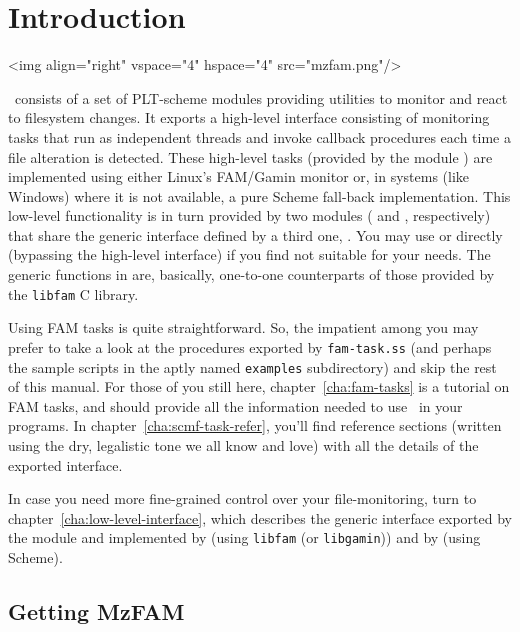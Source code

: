 
\chapter{Introduction}
\label{cha:introduction}

\htmlonly
\rawhtml<img align="right" vspace="4" hspace="4" src="mzfam.png"/>\endrawhtml
\endhtmlonly

\MzFam\ consists of a set of PLT-scheme modules providing utilities to
monitor and react to filesystem changes. It exports a high-level
interface consisting of monitoring tasks that run as independent
threads and invoke callback procedures each time a file alteration is
detected. These high-level tasks (provided by the module
) are implemented using either Linux's FAM/Gamin monitor
or, in systems (like Windows) where it is not available, a pure Scheme
fall-back implementation. This low-level functionality is in turn
provided by two modules ( and , respectively)
that share the generic interface defined by a third one,
. You may use  or  directly
(bypassing the high-level interface) if you find  not
suitable for your needs. The generic functions in  are,
basically, one-to-one counterparts of those provided by the
\texttt{libfam} C library.

Using FAM tasks is quite straightforward. So, the impatient among you
may prefer to take a look at the procedures exported by
\texttt{fam-task.ss} (and perhaps the sample scripts in the aptly
named \texttt{examples} subdirectory) and skip the rest of this
manual. For those of you still here, chapter~\ref{cha:fam-tasks} is a
tutorial on FAM tasks, and should provide all the information
needed to use \MzFam\ in your programs. In
chapter~\ref{cha:scmf-task-refer}, you'll find reference sections
(written using the dry, legalistic tone we all know and love) with all
the details of the exported  interface.

In case you need more fine-grained control over your file-monitoring,
turn to chapter~\ref{cha:low-level-interface}, which describes the
generic interface exported by the  module and
implemented by  (using \texttt{libfam} (or
\texttt{libgamin})) and by  (using Scheme).

\section{Getting MzFAM}
\label{sec:getting-mzfam}

